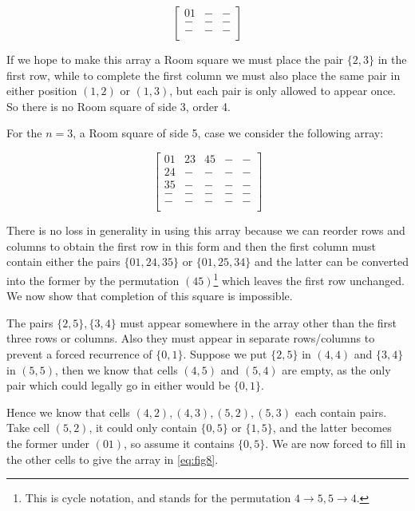 \documentclass[11pt, a4paper]{book}\usepackage[]{graphicx}\usepackage[]{xcolor}
\begin{document}
\begin{equation}
  \begin{bmatrix}
    01 &  - & - \\
    -   & - & - \\
    -   & - & - \\
  \end{bmatrix}
\end{equation}

If we hope to make this array a Room square we must place the pair $\{2, 3\}$ in the first row, while to complete the first column we must also place the same pair in either position $(1, 2)$ or $(1, 3)$, but each pair is only allowed to appear once. So there is no Room square of side 3, order 4.

For the $n = 3$, a Room square of side 5, case we consider the following array:

\begin{equation}
  \begin{bmatrix}
    01 & 23 & 45 & - & -  \\
    24 &  - &  - & - & -  \\
    35 &  - &  - & - & -  \\
     - &  - &  - & - & -  \\
     - &  - &  - & - & -  \\
  \end{bmatrix}
\end{equation}

There is no loss in generality in using this array because we can reorder rows and columns to obtain the first row in this form and then the first column must contain either the pairs $\{01, 24, 35\}$ or $\{01, 25, 34\}$ and the latter can be converted into the former by the permutation $(45)$\footnote{This is cycle notation, and stands for the permutation $4 \rightarrow 5, 5 \rightarrow 4$.}
which leaves the first row unchanged.
We now show that completion of this square is impossible.

The pairs $\{2,5\},\{3,4\}$ must appear somewhere in the array other than the first three rows or columns.
Also they must appear in separate rows/columns to prevent a forced recurrence of $\{0, 1\}$.
Suppose we put $\{2, 5\}$ in $(4, 4)$ and $\{3, 4\}$ in $(5, 5)$, then we know that cells $(4, 5)$ and $(5, 4)$ are empty, as the only pair which could legally go in either would be $\{0, 1\}$.

Hence we know that cells $(4, 2), (4, 3), (5, 2), (5, 3)$ each contain pairs.
Take cell $(5, 2)$, it could only contain $\{0, 5\}$ or $\{1, 5\}$, and the latter becomes the former under $(01)$, so assume it contains $\{0, 5\}$.
We are now forced to fill in the other cells to give the array in \eqref{eq:fig8}.
\end{document}
